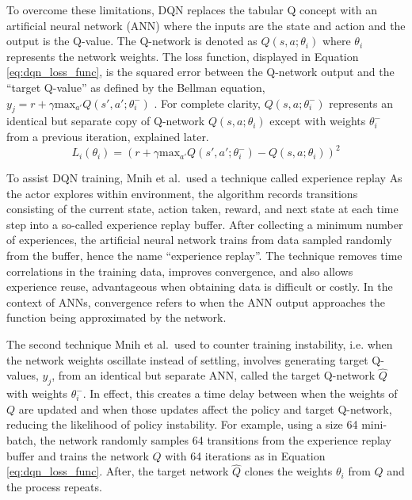 To overcome these limitations, DQN replaces the tabular Q concept with an artificial neural network (ANN) where the inputs are the state and action and the output is the Q-value. The Q-network is denoted as $Q(s,a;\theta_i)$ where $\theta_i$ represents the network weights. The loss function, displayed in Equation \ref{eq:dqn_loss_func}, is the squared error between the Q-network output and the ``target Q-value'' as defined by the Bellman equation, $y_j = r + \gamma \text{max}_{a'}Q(s', a';\theta^-_i)$  \cite{Mnih_2015}. For complete clarity, $Q(s,a;\theta^-_i)$ represents an identical but separate copy of Q-network $Q(s,a;\theta_i)$ except with weights $\theta^-_i$ from a previous iteration, explained later.
\begin{equation}
	\label{eq:dqn_loss_func}
L_i(\theta_i) = (r + \gamma \text{max}_{a'}Q(s', a';\theta^-_i)-Q(s,a;\theta_i))^2
\end{equation}

To assist DQN training, Mnih et al.\ used a technique called experience replay \cite{Mnih_2015} As the actor explores within environment, the algorithm records transitions consisting of the current state, action taken, reward, and next state at each time step into a so-called experience replay buffer. After collecting a minimum number of experiences, the artificial neural network trains from data sampled randomly from the buffer, hence the name ``experience replay''. The technique removes time correlations in the training data, improves convergence, and also allows experience reuse, advantageous when obtaining data is difficult or costly. In the context of ANNs, convergence refers to when the ANN output approaches the function being approximated by the network.

The second technique Mnih et al.\ used to counter training instability, i.e. when the network weights oscillate instead of settling, involves generating target Q-values, $y_j$, from an identical but separate ANN, called the target Q-network $\hat{Q}$ with weights $\theta^-_i$. In effect, this creates a time delay between when the weights of $Q$ are updated and when those updates affect the policy and target Q-network, reducing the likelihood of policy instability. For example, using a size 64 mini-batch, the network randomly samples 64 transitions from the experience replay buffer and trains the network $Q$ with 64 iterations as in Equation \ref{eq:dqn_loss_func}. After, the target network $\hat{Q}$ clones the weights $\theta_i$ from $Q$ and the process repeats.

